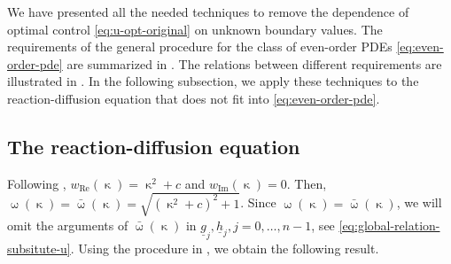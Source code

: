\documentclass[journal,twoside,web]{ieeecolor}
\newcommand{\wcomplex}{\upomega}
\newcommand{\kcomplex}{\upkappa}
\begin{document}
We have presented all the needed techniques to remove the dependence of optimal control \eqref{eq:u-opt-original} on unknown boundary values.
The requirements of the general procedure for the class of even-order PDEs \eqref{eq:even-order-pde} are summarized in .
The relations between different requirements are illustrated in .
In the following subsection, we apply these techniques to the reaction-diffusion equation that does not fit into \eqref{eq:even-order-pde}.

\subsection{The reaction-diffusion equation}
\label{sec:optimal-control-reaciton-diffusion}
Following , $w_{\text{Re}}(\kcomplex) = \kcomplex^2+c$ and $w_{\text{Im}}(\kcomplex) = 0$. 
Then, $\wcomplex(\kcomplex)=\bar{\wcomplex}(\kcomplex)=\sqrt{(\kcomplex^2+c)^2+1}$. Since $\wcomplex(\kcomplex)=\bar{\wcomplex}(\kcomplex)$, we will omit the arguments of $\bar{\wcomplex}(\kcomplex)$ in $\underline{g}_j,\underline{h}_j,j=0,\ldots,n-1$, see \eqref{eq:global-relation-subsitute-u}. Using the procedure in , we obtain the following result.
\end{document}
